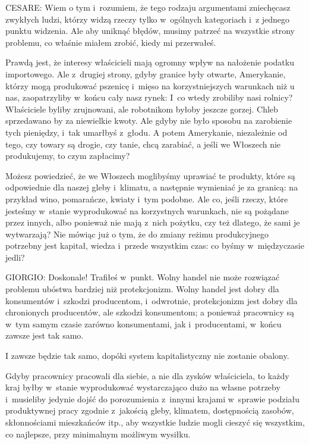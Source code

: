 \documentclass[oneside,polish,11pt,sfheadings]{mwbk}
\begin{document}
 
\noindent CESARE: Wiem o tym i~rozumiem, że tego rodzaju argumentami zniechęcasz zwykłych ludzi, którzy widzą rzeczy tylko w~ogólnych kategoriach i~z jednego punktu widzenia. Ale aby uniknąć błędów, musimy patrzeć na wszystkie strony problemu,
co właśnie miałem zrobić, kiedy mi przerwałeś. 




 
Prawdą jest, że interesy właścicieli mają ogromny wpływ na nałożenie podatku importowego. Ale z~drugiej strony, gdyby
granice były otwarte, Amerykanie, którzy mogą produkować pszenicę i~mięso na korzystniejszych warunkach niż u nas,
zaopatrzyliby w~końcu cały nasz rynek: I~co wtedy zrobiliby nasi rolnicy? Właściciele byliby zrujnowani, ale robotnikom
byłoby jeszcze gorzej. Chleb sprzedawano by za niewielkie kwoty. Ale gdyby nie było sposobu na zarobienie tych
pieniędzy, i~tak umarłbyś z~głodu. A potem Amerykanie, niezależnie od tego, czy towary są drogie, czy tanie, chcą
zarabiać, a jeśli we Włoszech nie produkujemy, to czym zapłacimy? 

 
Możesz powiedzieć, że we Włoszech moglibyśmy uprawiać te produkty, które są odpowiednie dla naszej gleby i~klimatu, a
następnie wymieniać je za granicą: na przykład wino, pomarańcze, kwiaty i~tym podobne. Ale co, jeśli rzeczy, które
jesteśmy w~stanie wyprodukować na korzystnych warunkach, nie są pożądane przez innych, albo ponieważ nie mają z~nich
pożytku, czy też dlatego, że sami je wytwarzają? Nie mówiąc już o tym, że do zmiany reżimu produkcyjnego potrzebny jest
kapitał, wiedza i~przede wszystkim czas: co byśmy w~międzyczasie jedli? 




 
\noindent GIORGIO: Doskonale! Trafiłeś w~punkt. Wolny handel nie może rozwiązać problemu ubóstwa bardziej niż protekcjonizm. Wolny
handel jest dobry dla konsumentów i~szkodzi producentom, i~odwrotnie, protekcjonizm jest dobry dla chronionych
producentów, ale szkodzi konsumentom; a ponieważ pracownicy są w~tym samym czasie zarówno konsumentami, jak i~producentami, w~końcu zawsze jest tak samo. 

 
I zawsze będzie tak samo, dopóki system kapitalistyczny nie zostanie obalony. 

 
Gdyby pracownicy pracowali dla siebie, a nie dla zysków właściciela, to każdy kraj byłby w~stanie wyprodukować
wystarczająco dużo na własne potrzeby i~musieliby jedynie dojść do porozumienia z~innymi krajami w~sprawie podziału
produktywnej pracy zgodnie z~jakością gleby, klimatem, dostępnością zasobów, skłonnościami mieszkańców itp., aby
wszystkie ludzie mogli cieszyć się wszystkim, co najlepsze, przy minimalnym możliwym wysiłku. 
\end{document}
